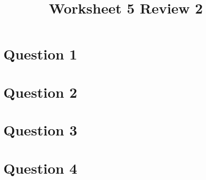 \documentclass[12pt]{article}
\begin{document}
\title{Worksheet 5 Review 2}
\maketitle

\section*{Question 1}

\section*{Question 2}

\section*{Question 3}

\section*{Question 4}
\end{document}
